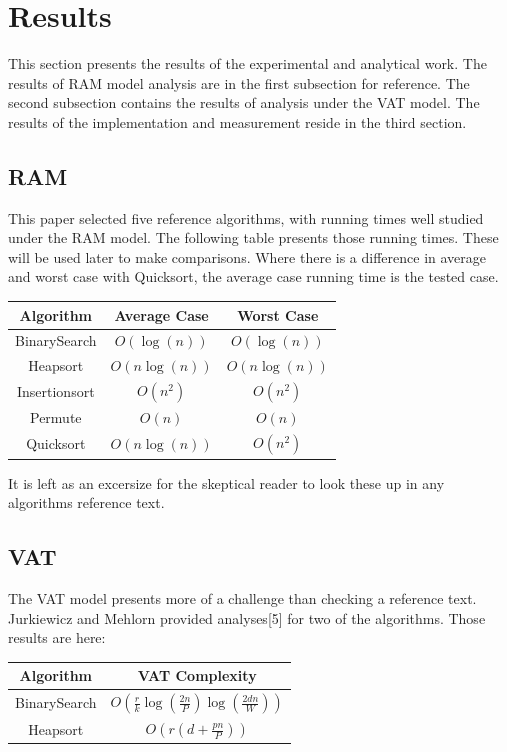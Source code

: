 \section{Results}

  This section presents the results of the experimental and analytical work.
  The results of RAM model analysis are in the first subsection for reference.
  The second subsection contains the results of analysis under the VAT model.
  The results of the implementation and measurement reside in the third
  section.

  \subsection{RAM}
    This paper selected five reference algorithms, with running times well 
    studied under the RAM model. The following table presents those running
    times. These will be used later to make comparisons. Where there is a
    difference in average and worst case with Quicksort, the average case
    running time is the tested case.
    
    \begin{tabular}{ccc}
      Algorithm     & Average Case  & Worst Case   \\\hline
      BinarySearch  & $O(\log(n))$  & $O(\log(n))$ \\
      Heapsort      & $O(n\log(n))$ & $O(n\log(n))$\\
      Insertionsort & $O(n^2)$      & $O(n^2)$     \\
      Permute       & $O(n)$        & $O(n)$       \\
      Quicksort     & $O(n\log(n))$ & $O(n^2)$     \\
    \end{tabular}
    
    It is left as an excersize for the skeptical reader to look these up in any
    algorithms reference text.

  \subsection{VAT}
    The VAT model presents more of a challenge than checking a reference text.
    Jurkiewicz and Mehlorn provided analyses[5] for two of the algorithms. 
    Those results are here:
    
    \begin{tabular}{cc}
      Algorithm    & VAT Complexity\\\hline
      BinarySearch &
$O\left(\frac{r}{k}\log(\frac{2n}{P})\log(\frac{2dn}{W})\right)$ \\
      Heapsort     & $O\left(r(d+\frac{pn}{P})\right)$ \\
    \end{tabular}
    
